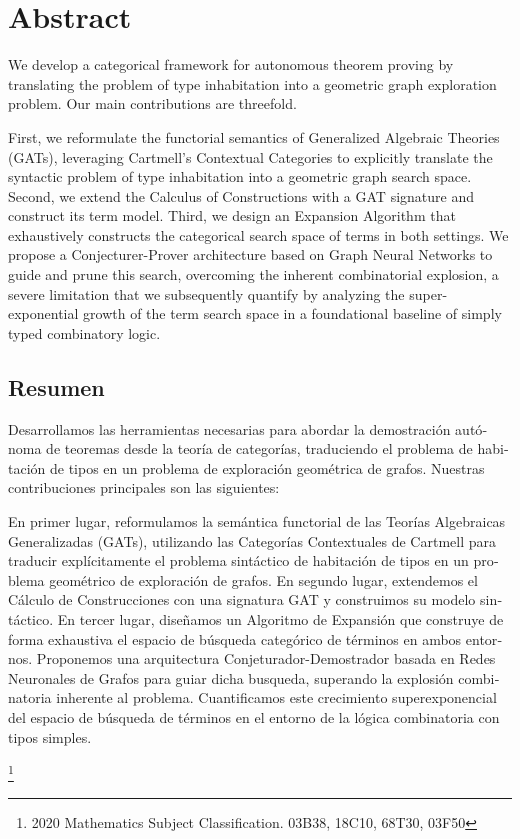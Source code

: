 \pagestyle{fancy}
\newpage \thispagestyle{empty}

\section*{Abstract}
We develop a categorical framework for autonomous theorem proving by translating the problem of type inhabitation 
into a geometric graph exploration problem. Our main contributions are threefold.

First, we reformulate the functorial semantics of Generalized Algebraic Theories (GATs), 
leveraging Cartmell's Contextual Categories  to explicitly translate the syntactic problem of type inhabitation into 
a geometric graph search space. 
Second, we extend the Calculus of \mbox{Constructions} with a GAT signature and construct its term model.
Third, we design an Expansion Algorithm that exhaustively constructs the categorical search space of terms in both 
settings. We propose a Conjecturer-Prover architecture based on Graph Neural Networks to guide and prune this search, overcoming 
the inherent combinatorial explosion, a severe limitation that we subsequently quantify by analyzing 
the super-exponential growth of the term search space in a foundational baseline of simply typed combinatory logic.

\begin{otherlanguage}{spanish}

\section*{Resumen}
Desarrollamos las herramientas necesarias para abordar la demostraci\'on aut\'onoma de teoremas desde la teor\'ia de categor\'ias,
traduciendo el problema de habitaci\'on de tipos en un problema de exploraci\'on geom\'etrica de grafos.
Nuestras contribuciones principales son las siguientes:

En primer lugar, reformulamos la sem\'antica functorial de las Teor\'ias Algebraicas Generalizadas (GATs),
utilizando las Categor\'ias Contextuales de Cartmell para traducir expl\'icitamente el problema sint\'actico de habitaci\'on de tipos en un 
problema geom\'etrico de exploraci\'on de grafos.
En segundo lugar, extendemos el C\'alculo de Construcciones con una signatura GAT y construimos su modelo sint\'actico.
En tercer lugar, dise\~namos un Algoritmo de Expansi\'on que construye 
de forma exhaustiva el espacio de b\'usqueda categ\'orico de t\'erminos en ambos entornos. Proponemos una 
arquitectura Conjeturador-Demostrador basada en Redes Neuronales de Grafos para guiar dicha busqueda,
superando la explosi\'on combinatoria inherente al problema. Cuantificamos este crecimiento superexponencial del espacio de b\'usqueda 
de t\'erminos en el entorno de la l\'ogica combinatoria con tipos simples.

\end{otherlanguage}

{\let\thefootnote\relax\footnote{2020 Mathematics Subject Classification. 03B38, 18C10, 68T30, 03F50}}